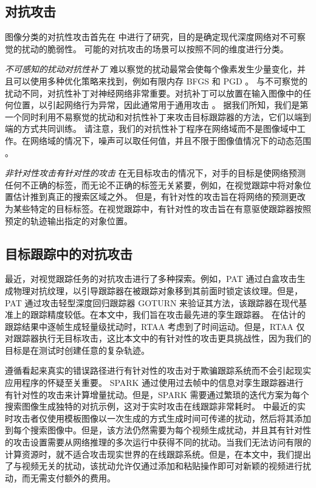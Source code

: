 \subsection{对抗攻击}

图像分类的对抗性攻击首先在 \cite{intriguing} 中进行了研究，目的是确定现代深度网络对不可察觉的扰动的脆弱性。
可能的对抗攻击的场景可以按照不同的维度进行分类。

\textit{不可感知的扰动对抗性补丁} 难以察觉的扰动最常会使每个像素发生少量变化，并且可以使用多种优化策略来找到，例如有限内存 BFGS \cite{intriguing} 和 PGD \cite{PGD}。
与不可察觉的扰动不同，对抗性补丁对神经网络非常重要。对抗补丁可以放置在输入图像中的任何位置，以引起网络行为异常，因此通常用于通用攻击 \cite{patch}。
据我们所知，我们是第一个同时利用不易察觉的扰动和对抗性补丁来攻击目标跟踪器的方法，它们以端到端的方式共同训练。
请注意，我们的对抗性补丁程序在网络域而不是图像域中工作。在网络域的情况下，噪声可以取任何值，并且不限于图像值情况下的动态范围  \cite{karmon2018lavan}。

\textit{非针对性攻击有针对性的攻击} 在无目标攻击的情况下，对手的目标是使网络预测任何不正确的标签，而无论不正确的标签无关紧要，例如，在视觉跟踪中将对象位置估计推到真正的搜索区域之外。
但是，有针对性的攻击旨在将网络的预测更改为某些特定的目标标签。在视觉跟踪中，有针对性的攻击旨在有意驱使跟踪器按照预定的轨迹输出指定的对象位置。

\subsection{目标跟踪中的对抗攻击}

最近，对视觉跟踪任务的对抗攻击进行了多种探索。例如，PAT \cite{PAT} 通过白盒攻击生成物理对抗纹理，以引导跟踪器在被跟踪对象移到其前面时锁定该纹理。但是，PAT 通过攻击轻型深度回归跟踪器 GOTURN \cite{GOTURN} 来验证其方法，该跟踪器在现代基准上的跟踪精度较低。在本文中，我们旨在攻击最先进的孪生跟踪器。
在估计的跟踪结果中逐帧生成轻量级扰动时，RTAA \cite{RTAA} 考虑到了时间运动。但是，RTAA 仅对跟踪器执行无目标攻击，这比本文中的有针对性的攻击更具挑战性，因为我们的目标是在测试时创建任意的复杂轨迹。

遵循看起来真实的错误路径进行有针对性的攻击对于欺骗跟踪系统而不会引起现实应用程序的怀疑至关重要。
SPARK \cite{SPARK} 通过使用过去帧中的信息对孪生跟踪器进行有针对性的攻击来计算增量扰动。但是，SPARK 需要通过繁琐的迭代方案为每个搜索图像生成独特的对抗示例，这对于实时攻击在线跟踪非常耗时。\cite{TTP} 中最近的实时攻击者仅使用模板图像以一次生成的方式生成时间可传递的扰动，然后将其添加到每个搜索图像中。但是，该方法仍然需要为每个视频生成扰动，并且其有针对性的攻击设置需要从网络推理的多次运行中获得不同的扰动。当我们无法访问有限的计算资源时，就不适合攻击现实世界的在线跟踪系统。但是，在本文中，我们提出了与视频无关的扰动，该扰动允许仅通过添加和粘贴操作即可对新颖的视频进行扰动，而无需支付额外的费用。


